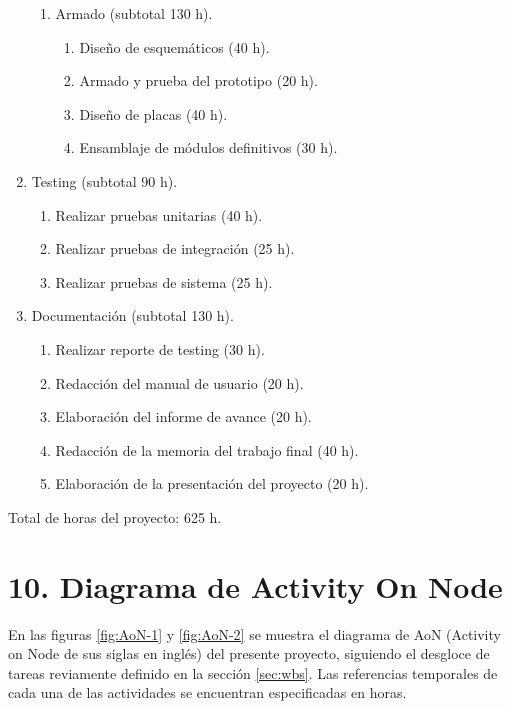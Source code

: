 \documentclass[
11pt, %
codirector, %
]{charter}
\begin{document}
\begin{enumerate}
\begin{enumerate}
	\item Armado (subtotal 130 h).
	
		\begin{enumerate}
			\item Diseño de esquemáticos (40 h).
			\item Armado y prueba del prototipo (20 h).
			\item Diseño de placas (40 h).
			\item Ensamblaje de módulos definitivos (30 h).
		
		\end{enumerate}
		
	\end{enumerate}
	
\item Testing (subtotal 90 h).
	\begin{enumerate}
	\item Realizar pruebas unitarias (40 h).
	\item Realizar pruebas de integración (25 h).
	\item Realizar pruebas de sistema (25 h).
	\end{enumerate}
	
\item Documentación (subtotal 130 h).
	\begin{enumerate}
	\item Realizar reporte de testing (30 h).
	\item Redacción del manual de usuario (20 h).
	\item Elaboración del informe de avance (20 h).
	\item Redacción de la memoria del trabajo final (40 h).
	\item Elaboración de la presentación del proyecto (20 h).
	\end{enumerate}
	
\end{enumerate}

Total de horas del proyecto: 625 h.

\section{10. Diagrama de Activity On Node}
\label{sec:AoN}

En las figuras \ref{fig:AoN-1} y \ref{fig:AoN-2} se muestra el diagrama de AoN (Activity on Node de sus siglas en inglés) del presente proyecto, siguiendo el desgloce de tareas reviamente definido en la sección \ref{sec:wbs}. Las referencias temporales de cada una de las actividades se encuentran especificadas en horas. 
\end{document}
